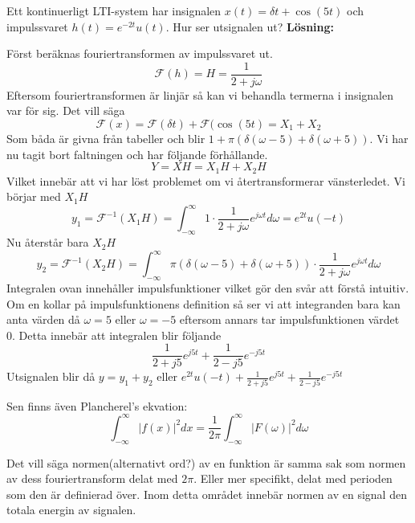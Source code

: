 \documentclass{article}
\begin{document}
Ett kontinuerligt LTI-system har insignalen $x(t)=\delta{t} + \cos(5 t)$ och impulssvaret $h(t) = e^{-2 t} u(t)$. Hur ser utsignalen ut?
\textbf{Lösning:}

Först beräknas fouriertransformen av impulssvaret ut. 
\[\mathcal{F}(h) = H = \frac{1}{2+j \omega}\]
Eftersom fouriertransformen är linjär så kan vi behandla termerna i insignalen var för sig. Det vill säga 
\[\mathcal{F} (x) = \mathcal{F}(\delta{t}) + \mathcal{F}(\cos(5 t) = X_1 + X_2 \]
Som båda är givna från tabeller och blir $1+\pi(\delta(\omega - 5) + \delta(\omega + 5))$. Vi har nu tagit bort faltningen och har följande förhållande.
\[Y = X H = X_1 H + X_2 H\]
Vilket innebär att vi har löst problemet om vi återtransformerar vänsterledet. Vi börjar med $X_1 H$
\[y_1=\mathcal{F}^{-1}(X_1 H) =  \int_{-\infty}^{\infty} 1 \cdot \frac{1}{2+j \omega} e^{j \omega t} d\omega = e^{2 t} u(-t)\]
Nu återstår bara $X_2 H$
\[y_2=\mathcal{F}^{-1}(X_2 H) = \int_{-\infty}^{\infty} \pi(\delta(\omega - 5) + \delta(\omega + 5)) \cdot \frac{1}{2+j \omega} e^{j \omega t} d\omega \]
Integralen ovan innehåller impulsfunktioner vilket gör den svår att förstå intuitiv. Om en kollar på impulsfunktionens definition så ser vi att integranden bara kan anta värden då $\omega=5$ eller $\omega =-5$ eftersom annars tar impulsfunktionen värdet 0. Detta innebär att integralen blir följande
$$\frac{1}{2+j 5} e^{j 5 t} + \frac{1}{2-j 5} e^{-j 5 t}$$ %
Utsignalen blir då $y=y_1 + y_2$ eller $e^{2 t} u(-t) + \frac{1}{2+j 5} e^{j 5 t} + \frac{1}{2-j 5} e^{-j 5 t}$

Sen finns även Plancherel's ekvation: %
\[\int_{-\infty}^{\infty} |f(x)|^2 dx = \frac{1}{2 \pi}\int_{-\infty}^{\infty} |F(\omega)|^2 d\omega \] %

Det vill säga normen(alternativt ord?) av en funktion är samma sak som normen av dess fouriertransform delat med $2 \pi$. Eller mer specifikt, delat med perioden som den är definierad över. Inom detta området innebär normen av en signal den totala energin av signalen. %
\end{document}
